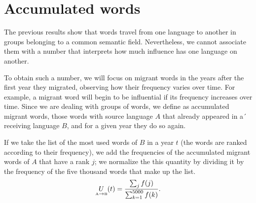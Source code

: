 \documentclass[10pt,letterpaper]{article} %
\begin{document}
	
	
	\section*{Accumulated words} %
	
	
	
	The previous results show that words travel from one language to another in groups belonging to a common semantic field. Nevertheless, we cannot associate them with a number that interprets how much influence has one language on another.
	
	To obtain such a number, we will focus on migrant words in the years after the first year they migrated, observing how their frequency varies over time. For example, a migrant word will begin to be influential if its frequency increases over time. Since we are dealing with groups of words, we define as accumulated migrant words, those words with source language $A$ that already appeared in a´ receiving language $B$, and for a given year they do so again.
	
	If we take the list of the most used words of $B$ in a year $t$ (the words are ranked according to their frequency), we add the frequencies of the accumulated migrant words of $A$ that have a rank $j$; we normalize the this quantity by dividing it by the frequency of the five thousand words that make up the list.
	\begin{equation}
	\label{ec.fuso}
	\underset{ \text{\tiny A} \to  \text{\tiny B} }{U}(t) = \frac{\sum_{j} f(j)}{\sum_{k=1}^{5000} f(k)}.
	\end{equation}
	
\end{document}
